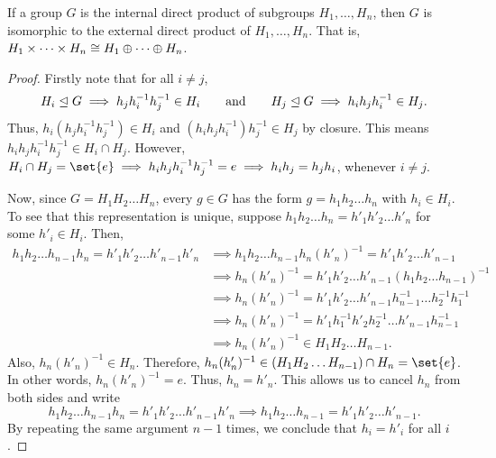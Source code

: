 \documentclass[11pt]{penrose}
\begin{document}
\begin{nthm}
    If a group $G$ is the internal direct product of subgroups $H_{1}, \dots, H_{n}$, then $G$ is isomorphic to the external direct product of $H_{1}, \dots, H_{n}$. That is, $H_{1} \times \dots \times H_{n} \mathrel{\cong} H_{1} \oplus \dots \oplus H_{n}$.
\end{nthm}
\begin{proof}
    Firstly note that for all $i \neq j$,
    \begin{equation*}
        H_{i} \mathrel{\trianglelefteq} G \implies h_{j} h_{i}^{-1} h_{j}^{-1} \in H_{i}
        \qquad\text{and}\qquad
        H_{j} \mathrel{\trianglelefteq} G \implies h_{i} h_{j} h_{i}^{-1} \in H_{j}.
    \end{equation*}
    Thus, $h_{i} (h_{j} h_{i}^{-1} h_{j}^{-1}) \in H_{i}$ and $(h_{i} h_{j} h_{i}^{-1}) h_{j}^{-1} \in H_{j}$ by closure. This means $h_{i} h_{j} h_{i}^{-1} h_{j}^{-1} \in H_{i} \cap H_{j}$. However, $H_{i} \cap H_{j} = \set{e} \implies h_{i} h_{j} h_{i}^{-1} h_{j}^{-1} = e \implies h_{i} h_{j} = h_{j} h_{i}$, whenever $i \neq j$.

    Now, since $G = H_{1} H_{2} \dots H_{n}$, every $g \in G$ has the form $g = h_{1} h_{2} \dots h_{n}$ with $h_{i} \in H_{i}$. To see that this representation is unique, suppose $h_{1} h_{2} \dots h_{n}  = h'_{1} h'_{2} \dots h'_{n}$ for some $h'_{i} \in H_{i}$. Then,
    \begin{align*}
        h_{1} h_{2} \dots h_{n-1} h_{n}  = h'_{1} h'_{2} \dots h'_{n-1} h'_{n}
        &\implies h_{1} h_{2} \dots h_{n-1} h_{n} (h'_{n})^{-1}  = h'_{1} h'_{2} \dots h'_{n-1}\\
        &\implies h_{n} (h'_{n})^{-1} = h'_{1} h'_{2} \dots h'_{n-1} (h_{1} h_{2} \dots h_{n-1})^{-1}\\
        &\implies h_{n} (h'_{n})^{-1} = h'_{1} h'_{2} \dots h'_{n-1} h_{n-1}^{-1} \dots h_{2}^{-1} h_{1}^{-1}\\
        &\implies h_{n} (h'_{n})^{-1} = h'_{1}h_{1}^{-1} h'_{2}h_{2}^{-1} \dots h'_{n-1}h_{n-1}^{-1}\\
        &\implies h_{n} (h'_{n})^{-1} \in H_{1}H_{2} \dots H_{n-1}.
    \end{align*}
    Also, $h_{n} (h'_{n})^{-1} \in H_{n}$. Therefore, $h_{n} (h'_{n})^{-1} \in (H_{1}H_{2} \dots H_{n-1}) \cap H_{n} = \set{e}$. In other words, $h_{n} (h'_{n})^{-1} = e$. Thus, $h_{n} = h'_{n}$. This allows us to cancel $h_{n}$ from both sides and write
    \begin{equation*}
        h_{1} h_{2} \dots h_{n-1} h_{n}  = h'_{1} h'_{2} \dots h'_{n-1} h'_{n}
        \implies
        h_{1} h_{2} \dots h_{n-1}  = h'_{1} h'_{2} \dots h'_{n-1}.
    \end{equation*}
    By repeating the same argument $n-1$ times, we conclude that $h_{i} = h'_{i}$ for all $i$.


\end{proof}
\end{document}

